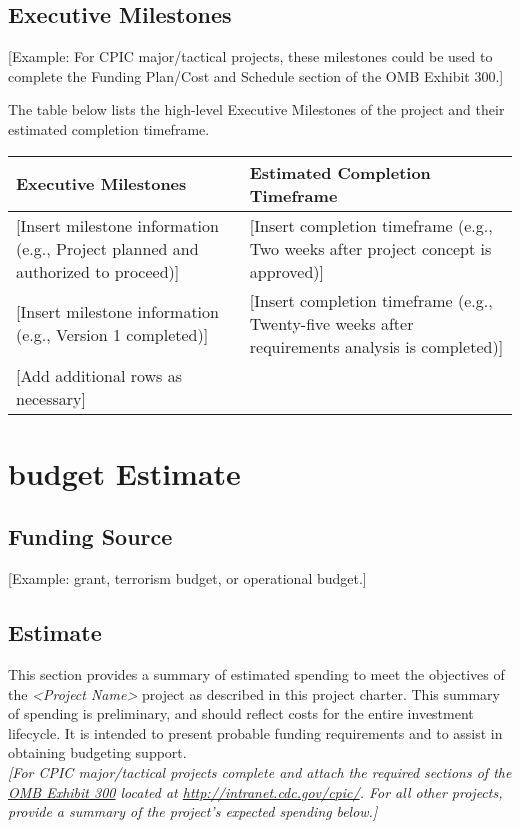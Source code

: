 \hypertarget{executive-milestones}{%
\subsection{Executive Milestones }\label{executive-milestones}}

{[}Example: For CPIC major/tactical projects, these milestones could be
used to complete the Funding Plan/Cost and Schedule section of the OMB
Exhibit 300.{]}

The table below lists the high-level Executive Milestones of the project
and their estimated completion timeframe.

\begin{longtable}[]{@{}ll@{}}
\toprule
\textbf{Executive Milestones } & \textbf{Estimated Completion
Timeframe}\tabularnewline
\midrule
\endhead
{[}Insert milestone information (e.g., Project planned and authorized to
proceed){]} & {[}Insert completion timeframe (e.g., Two weeks after
project concept is approved){]}\tabularnewline
{[}Insert milestone information (e.g., Version 1 completed){]} &
{[}Insert completion timeframe (e.g., Twenty-five weeks after
requirements analysis is completed){]}\tabularnewline
{[}Add additional rows as necessary{]} &\tabularnewline
\bottomrule
\end{longtable}

\hypertarget{budget-estimate}{%
\section{budget Estimate}\label{budget-estimate}}

\hypertarget{funding-source}{%
\subsection{Funding Source}\label{funding-source}}

{[}Example: grant, terrorism budget, or operational budget.{]}

\hypertarget{estimate}{%
\subsection{Estimate}\label{estimate}}

This section provides a summary of estimated spending to meet the
objectives of the \emph{\textless{}Project Name\textgreater{}} project
as described in this project charter. This summary of spending is
preliminary, and should reflect costs for the entire investment
lifecycle. It is intended to present probable funding requirements and
to assist in obtaining budgeting support.\\
\emph{{[}For CPIC major/tactical projects complete and attach the
required sections of the \href{http://intranet.cdc.gov/cpic/}{OMB
Exhibit 300} located at \url{http://intranet.cdc.gov/cpic/}. For all
other projects, provide a summary of the project's expected spending}
\emph{below.{]}}

